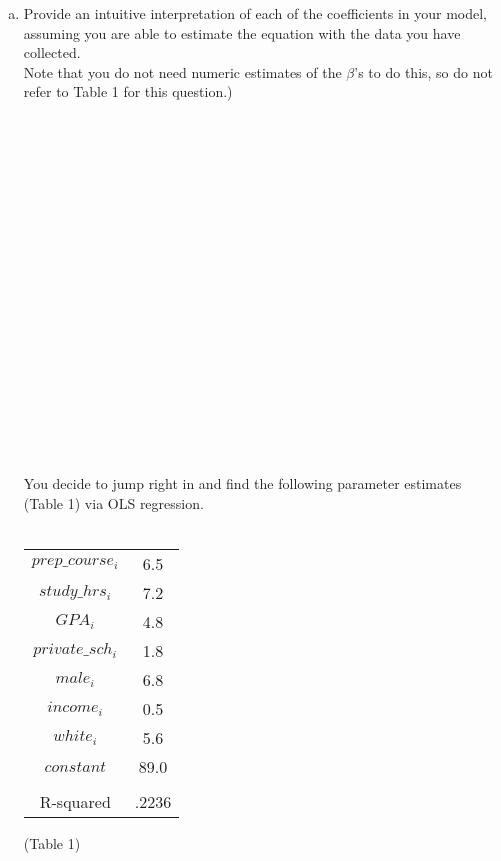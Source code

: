 \documentclass[12pt]{article}
\begin{document}
\begin{enumerate}[(1)]
\begin{enumerate}[(a)]
\item Provide an intuitive interpretation of each of the coefficients in your model, assuming you are able to estimate the equation with the data you have collected. \\
Note that you do not need numeric estimates of the $\beta$’s to do this, so do not refer to Table 1 for this question.)\\
\\
\\
\\
\\
\\
\\
\\
\\
\\
\\
\\
\\
\\
\\
\\
\\
\\
\\
\\
You decide to jump right in and find the following parameter estimates (Table 1) via OLS regression.\\
\pagebreak\\
\begin{tabular}{ c c }
 $prep\_course_i$ & 6.5 \\ 
 $study\_hrs_i$ & 7.2 \\  
 $GPA_i$ & 4.8 \\
 $private\_sch_i$ & 1.8\\
 $male_i$ & 6.8 \\
 $income_i$ & 0.5\\
 $white_i$ & 5.6\\
 $constant$ & 89.0\\
 \\
 R-squared & .2236\\
\end{tabular}
 (Table 1)\\


\end{enumerate}
\end{enumerate}
\end{document}
